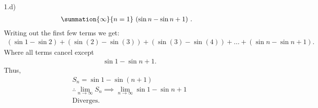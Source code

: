 \documentclass{report}
\begin{document}
    \bigbreak \noindent 
    1.d)
    \begin{align*}
        \summation{\infty}{n=1}\ (\sin{n} - \sin{n+1})\ 
    .\end{align*}
    \bigbreak \noindent 
    Writing out the first few terms we get:
    \begin{align*}
        (\sin{1} - \sin{2}) + (\sin{(2)} - \sin{(3)}) + (\sin{(3)} - \sin{(4)}) + ... + (\sin{n} - \sin{n+1})
    .\end{align*}
    \bigbreak \noindent 
    Where all terms cancel except
    \begin{align*}
        &\sin{1} - \sin{n+1}
    .\end{align*}
    \bigbreak \noindent 
    Thus,
    \begin{align*}
        &S_{n} = \sin{1} - \sin{(n+1)} \\
        &\therefore \lim\limits_{n \to \infty}{S_{n}} \implies \lim\limits_{n \to \infty}{\sin{1} - \sin{n+1}}\\
        &\text{Diverges}
    .\end{align*}
\end{document}
